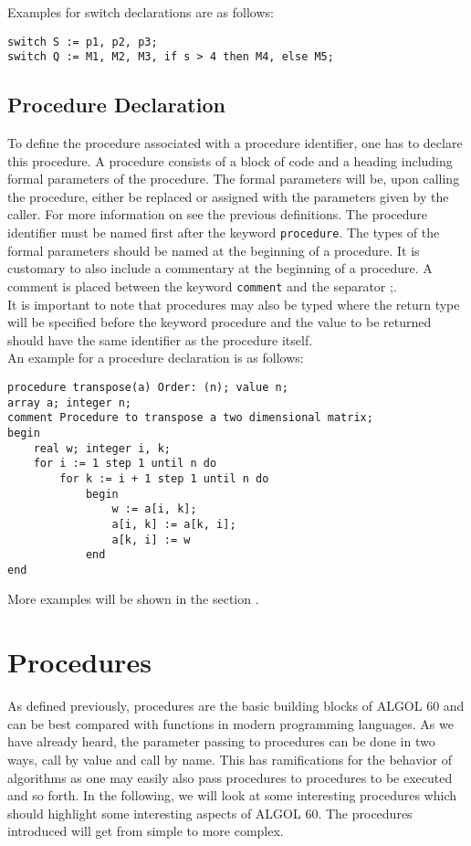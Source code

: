 \documentclass{article}
\begin{document}
Examples for switch declarations are as follows:\\ 
\begin{lstlisting}[language={[60]algol}]
switch S := p1, p2, p3;
switch Q := M1, M2, M3, if s > 4 then M4, else M5;
\end{lstlisting}

\subsection{Procedure Declaration} \label{procDecl}
To define the procedure associated with a procedure identifier, one has to declare this procedure. A procedure consists of a block of code and a heading including formal parameters of the procedure. The formal parameters will be, upon calling the procedure, either be replaced or assigned with the parameters given by the caller. For more information on  see the previous definitions. The procedure identifier must be named first after the keyword \texttt{procedure}. The types of the formal parameters should be named at the beginning of a procedure. It is customary to also include a commentary at the beginning of a procedure. A comment is placed between the keyword \texttt{comment} and the separator ;.\\

It is important to note that procedures may also be typed where the return type will be specified before the keyword procedure and the value to be returned should have the same identifier as the procedure itself.\\
\newpage
An example for a procedure declaration is as follows:\\ 
\begin{lstlisting}[language={[60]algol}]
procedure transpose(a) Order: (n); value n;
array a; integer n;
comment Procedure to transpose a two dimensional matrix;
begin
    real w; integer i, k;
    for i := 1 step 1 until n do
        for k := i + 1 step 1 until n do
            begin
                w := a[i, k];
                a[i, k] := a[k, i];
                a[k, i] := w
            end
end
\end{lstlisting}

More examples will be shown in the section .

\newpage

\section{Procedures} \label{procedures}
As defined previously, procedures are the basic building blocks of ALGOL 60 and can be best compared with functions in modern programming languages. As we have already heard, the parameter passing to procedures can be done in two ways, call by value and call by name. This has ramifications for the behavior of algorithms as one may easily also pass procedures to procedures to be executed and so forth. In the following, we will look at some interesting procedures which should highlight some interesting aspects of ALGOL 60. The procedures introduced will get from simple to more complex. \\
\end{document}
